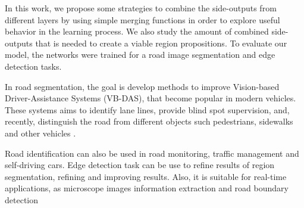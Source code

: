 In this work, we propose some strategies to combine the side-outputs from different layers by using simple merging functions in order to explore useful behavior in the learning process.
We also study the amount of combined side-outputs that is needed to create a viable region propositions.
To evaluate our model, the networks were trained for a road image segmentation and edge detection tasks.

In road segmentation, the goal is develop methods to improve Vision-based Driver-Assistance Systems (VB-DAS), that become popular in modern vehicles.
These systems aims to identify lane lines, provide blind spot supervision, and, recently, distinguish the road from different objects such pedestrians, sidewalks and other vehicles \cite{Saleem:2018, Yang:2018, Rezaei:2017}.

Road identification can also be used in road monitoring, traffic management and self-driving cars.
Edge detection task can be use to refine results of region segmentation, refining and improving results.
Also, it is suitable for real-time applications, as microscope images information extraction and road boundary detection \cite{Qu:2020, Li:2020, Perng:2020}

